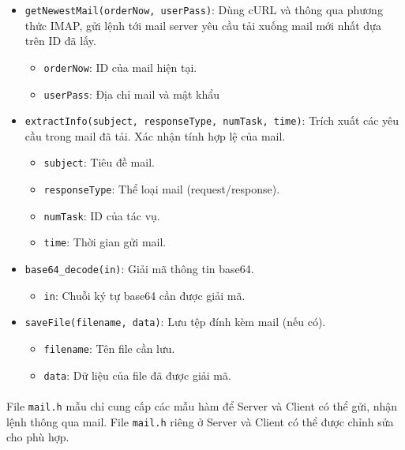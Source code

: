 \begin{itemize}
    \item \texttt{getNewestMail(orderNow, userPass)}: Dùng cURL và thông qua phương thức IMAP, gửi lệnh tới mail server yêu cầu tải xuống mail mới nhất dựa trên ID đã lấy.
    \begin{itemize}
        \item \texttt{orderNow}: ID của mail hiện tại.
        \item \texttt{userPass}: Địa chỉ mail và mật khẩu
    \end{itemize}
        
    \item \texttt{extractInfo(subject, responseType, numTask, time)}: Trích xuất các yêu cầu trong mail đã tải. Xác nhận tính hợp lệ của mail.
    \begin{itemize}
        \item \texttt{subject}: Tiêu đề mail.
        \item \texttt{responseType}: Thể loại mail (request/response).
        \item \texttt{numTask}: ID của tác vụ.
        \item \texttt{time}: Thời gian gửi mail.
    \end{itemize}
        
        
    \item \texttt{base64\_decode(in)}: Giải mã thông tin base64.
    \begin{itemize}
        \item \texttt{in}: Chuỗi ký tự base64 cần được giải mã.
    \end{itemize}
        
    \item \texttt{saveFile(filename, data)}: Lưu tệp đính kèm mail (nếu có).
    \begin{itemize}
        \item \texttt{filename}: Tên file cần lưu.
        \item \texttt{data}: Dữ liệu của file đã được giải mã.
    \end{itemize}
    
\end{itemize}

\paragraph{}{File \texttt{mail.h} mẫu chỉ cung cấp các mẫu hàm để Server và Client có thể gửi, nhận lệnh thông qua mail. File \texttt{mail.h} riêng ở Server và Client có thể được chỉnh sửa cho phù hợp.}


